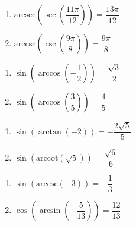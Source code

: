 \begin{multicols}{2}

\begin{enumerate}

\setcounter{enumi}{\value{HW}}

\item  $\text{arcsec}\left(\sec\left(\dfrac{11\pi}{12}\right) \right) = \dfrac{13\pi}{12}$
\item  $\text{arccsc}\left(\csc\left(\dfrac{9\pi}{8}\right) \right) = \dfrac{9\pi}{8}$ 

\setcounter{HW}{\value{enumi}}

\end{enumerate}

\end{multicols}


\begin{multicols}{2}

\begin{enumerate}

\setcounter{enumi}{\value{HW}}

\item  $\sin\left(\arccos\left(-\dfrac{1}{2}\right)\right) = \dfrac{\sqrt{3}}{2}$
\item  $\sin\left(\arccos\left(\dfrac{3}{5}\right)\right) = \dfrac{4}{5}$

\setcounter{HW}{\value{enumi}}

\end{enumerate}

\end{multicols}

\begin{multicols}{2}

\begin{enumerate}

\setcounter{enumi}{\value{HW}}

\item  $\sin\left(\arctan\left(-2\right)\right) = -\dfrac{2\sqrt{5}}{5}$
\item  $\sin\left(\text{arccot}\left(\sqrt{5}\right)\right) = \dfrac{\sqrt{6}}{6}$

\setcounter{HW}{\value{enumi}}

\end{enumerate}

\end{multicols}

\begin{multicols}{2}

\begin{enumerate}

\setcounter{enumi}{\value{HW}}

\item  $\sin\left(\text{arccsc}\left(-3\right)\right) = -\dfrac{1}{3}$ 
\item  $\cos\left(\arcsin\left(-\dfrac{5}{13}\right)\right) = \dfrac{12}{13}$

\setcounter{HW}{\value{enumi}}

\end{enumerate}

\end{multicols}

